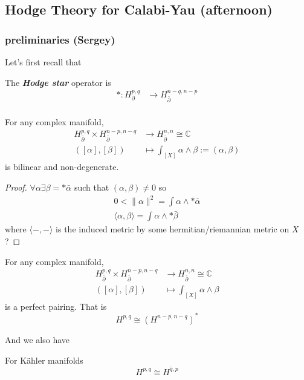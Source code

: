 \documentclass{article}
\numberwithin{equation}{section}
\newcommand{\C}{\mathbb{C}}
\begin{document}
\subsection{Hodge Theory for Calabi-Yau (afternoon)}
\subsubsection{preliminaries (Sergey)}
Let's first recall that
\begin{defn}
	The \textbf{\textit{Hodge star}} operator is 
	\begin{align*}
		*:H_\partial^{p,q}&\to H_{\bar\partial}^{n-q,n-p}\\
	\end{align*}
\end{defn}
\begin{prop}
	For any complex manifold,
	\begin{align*}
		H^{p,q}_{\bar\partial}\times H^{n-p,n-q}_{\bar\partial}&\to H^{n,n}_{\bar\partial}\cong\C\\
		([\alpha],[\beta])&\mapsto\int_{[X]}\alpha\wedge\beta:=(\alpha,\beta)
	\end{align*}
	is bilinear and non-degenerate.
\end{prop}
\begin{proof}
	$\forall\alpha\exists\beta=*\bar\alpha$ such that $(\alpha,\beta)\neq0$ so
	\begin{align*}
		0<\|\alpha\|^2=\int\alpha\wedge*\bar\alpha\\
		\langle\alpha,\beta\rangle=\int\alpha\wedge*\bar\beta
	\end{align*}
	{\color{magenta}where $\langle-,-\rangle$ is the induced metric by some hermitian/riemannian metric on $X$?}
\end{proof}

\begin{thm}
	For any complex manifold,
	\begin{align*}
		H^{p,q}_{\bar\partial}\times H^{n-p,n-q}_{\bar\partial}&\to H^{n,n}_{\bar\partial}\cong\C\\
		([\alpha],[\beta])&\mapsto\int_{[X]}\alpha\wedge\beta
	\end{align*}
	is a perfect pairing. That is
	\[H^{p,q}\cong(H^{n-p,n-q})^*\]
\end{thm}
And we also have
\begin{thm}[Hodge]
	For Kähler manifolds
	\[H^{p,q}\cong \overline{H^{q,p}}\]
\end{thm}
\end{document}
